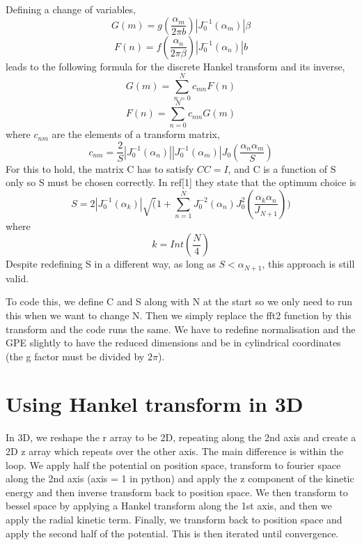 \documentclass[12pt]{article}
\begin{document}
Defining a change of variables, 
\begin{equation}
G(m) = g(\frac{\alpha_{m}}{2\pi b})|J_{0}^{-1}(\alpha_{m})|\beta
\end{equation}
\begin{equation}
F(n) = f(\frac{\alpha_{n}}{2\pi \beta})|J_{0}^{-1}(\alpha_{n})|b
\end{equation}
leads to the following formula for the discrete Hankel transform and its inverse,
\begin{equation}
G(m) = \sum_{n=0}^{N}c_{mn}F(n)
\end{equation}
\begin{equation}
F(n) =  \sum_{n=0}^{N}c_{nm}G(m)
\end{equation}
where $c_{nm}$ are the elements of a transform matrix, 
\begin{equation}
c_{nm} = \frac{2}{S}|J_{0}^{-1}(\alpha_{n})||J_{0}^{-1}(\alpha_{m})|J_{0}(\frac{\alpha_{n}\alpha_{m}}{S})
\end{equation}
For this to hold, the matrix C has to satisfy $CC =I$, and C is a function of S only so S must be chosen correctly. In ref[1] they state that the optimum choice is 
\begin{equation}
S = 2|J_{0}^{-1}(\alpha_{k})|\sqrt(1+\sum_{n=1}^{N}J_{0}^{-2}(\alpha_{n})J_{0}^{2}(\frac{\alpha_{k}\alpha_{n}}{J_{N+1}}))
\end{equation}
where 
\begin{equation}
k = Int(\frac{N}{4})
\end{equation}
Despite redefining S in a different way, as long as $S<\alpha_{N+1}$, this approach is still valid.


 To code this, we  define C and S along with N at the start so we only need to run this when we want to change N. Then we simply replace the fft2 function by this transform and the code runs the same. We have to redefine normalisation and the GPE slightly to have the reduced dimensions and be in cylindrical coordinates (the g factor must be divided by $2\pi$).
\section{Using Hankel transform in 3D}

In 3D, we reshape the r array to be 2D, repeating along the 2nd axis and create a 2D z array which repeats over the other axis. The main difference is within the loop. We apply half the potential on position space, transform to fourier space along the 2nd axis (axis = 1 in python) and apply the z component of the kinetic energy and then inverse transform back to position space. We then transform to bessel space by applying a Hankel transform along the 1st axis, and then we apply the radial kinetic term. Finally, we transform back to position space and apply the second half of the potential. This is then iterated until convergence.
\end{document}
